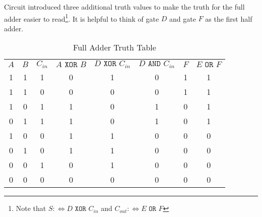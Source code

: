Circuit  introduced three additional truth values
to make the truth  for the full adder easier
to read\footnote{Note that $S:\Leftrightarrow D\texttt{ XOR } C_{in}$ and
	$C_{out} :\Leftrightarrow E\texttt{ OR }F$}. It is helpful to think of gate $D$
and gate $F$ as the first half adder.

\begin{table}[hbt!]
	\centering
	\begin{tabular}{*{8}{c}}
		$A$ & $B$ & $C_{in}$ & $A\texttt{ XOR }B$ & $D\texttt{ XOR }C_{in}$ & $D\texttt{ AND }C_{in}$ & $F$ & $E\texttt{ OR }F$ \\
		1   & 1   & 1        & 0                  & 1                       & 0                       & 1   & 1                 \\
		1   & 1   & 0        & 0                  & 0                       & 0                       & 1   & 1                 \\
		1   & 0   & 1        & 1                  & 0                       & 1                       & 0   & 1                 \\
		0   & 1   & 1        & 1                  & 0                       & 1                       & 0   & 1                 \\
		1   & 0   & 0        & 1                  & 1                       & 0                       & 0   & 0                 \\
		0   & 1   & 0        & 1                  & 1                       & 0                       & 0   & 0                 \\
		0   & 0   & 1        & 0                  & 1                       & 0                       & 0   & 0                 \\
		0   & 0   & 0        & 0                  & 0                       & 0                       & 0   & 0                 \\
	\end{tabular}
	\caption{Full Adder Truth Table}\label{truth-table-full-adder}
\end{table}
